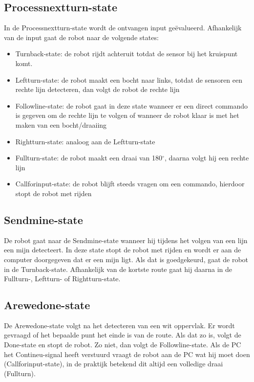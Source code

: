 \documentclass{report}
\begin{document}
\subsection{Processnextturn-state}
In de Processnextturn-state wordt de ontvangen input geëvalueerd.
Afhankelijk van de input gaat de robot naar de volgende states:
\begin{itemize}
\item Turnback-state: de robot rijdt achteruit totdat de sensor bij het kruispunt komt.
\item Leftturn-state: de robot maakt een bocht naar links, totdat de sensoren een rechte lijn detecteren, dan volgt de robot de rechte lijn
\item Followline-state: de robot gaat in deze state wanneer er een direct commando is gegeven om de rechte lijn te volgen of wanneer de robot klaar is met het maken van een bocht/draaiing
\item Rightturn-state: analoog aan de Leftturn-state
\item Fullturn-state: de robot maakt een draai van 180$^\circ$, daarna volgt hij een rechte lijn
\item Callforinput-state: de robot blijft steeds vragen om een commando, hierdoor stopt de robot met rijden
\end{itemize} 

\subsection{Sendmine-state}
De robot gaat naar de Sendmine-state wanneer hij tijdens het volgen van een lijn een mijn detecteert.
In deze state stopt de robot met rijden en wordt er aan de computer doorgegeven dat er een mijn ligt.
Als dat is goedgekeurd, gaat de robot in de Turnback-state. Afhankelijk van de kortste route gaat hij daarna in de Fullturn-, Leftturn- of Rightturn-state. 

\subsection{Arewedone-state}
De Arewedone-state volgt na het detecteren van een wit oppervlak.
Er wordt gevraagd of het bepaalde punt het einde is van de route.
Als dat zo is, volgt de Done-state en stopt de robot.
Zo niet, dan volgt de Followline-state.
Als de PC het Contineu-signal heeft verstuurd vraagt de robot aan de PC wat hij moet doen (Callforinput-state), in de praktijk betekend dit altijd een volledige draai (Fullturn).
\end{document}
